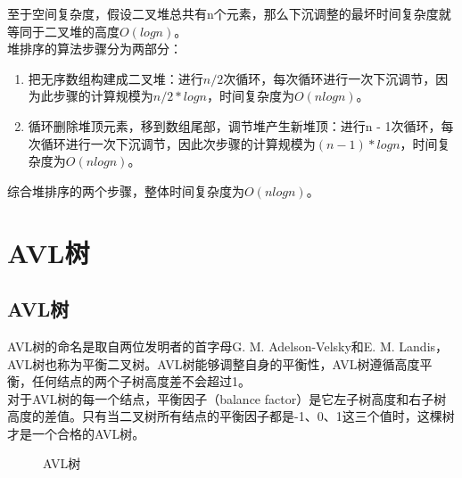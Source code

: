 至于空间复杂度，假设二叉堆总共有n个元素，那么下沉调整的最坏时间复杂度就等同于二叉堆的高度$ O(logn) $。\\

堆排序的算法步骤分为两部分：

\begin{enumerate}
	\item 把无序数组构建成二叉堆：进行$ n / 2 $次循环，每次循环进行一次下沉调节，因为此步骤的计算规模为$ n/2 * logn $，时间复杂度为$ O(nlogn) $。

	\item 循环删除堆顶元素，移到数组尾部，调节堆产生新堆顶：进行n - 1次循环，每次循环进行一次下沉调节，因此次步骤的计算规模为$ (n-1) * logn $，时间复杂度为$ O(nlogn) $。
\end{enumerate}

综合堆排序的两个步骤，整体时间复杂度为$ O(nlogn) $。

\newpage

\section{AVL树}

\subsection{AVL树}

AVL树的命名是取自两位发明者的首字母G. M. Adelson-Velsky和E. M. Landis，AVL树也称为平衡二叉树。AVL树能够调整自身的平衡性，AVL树遵循高度平衡，任何结点的两个子树高度差不会超过1。\\

对于AVL树的每一个结点，平衡因子（balance factor）是它左子树高度和右子树高度的差值。只有当二叉树所有结点的平衡因子都是-1、0、1这三个值时，这棵树才是一个合格的AVL树。

\begin{figure}[H]
	\centering
	\caption{AVL树}
\end{figure}

